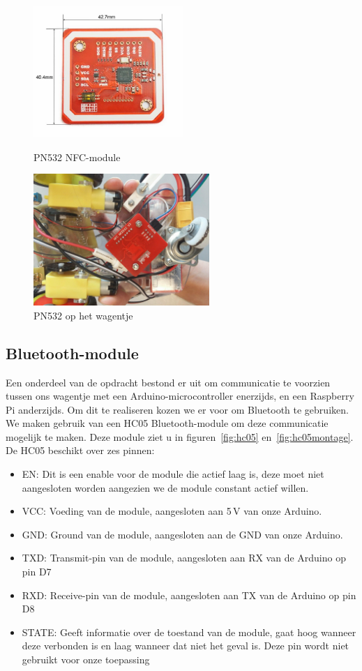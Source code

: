 \begin{figure}[H]
	\centering
	\begin{minipage}[b]{0.4\textwidth}
		\centering
		\includegraphics[height=5cm]{rfidlezer.png}
		\caption{PN532 NFC-module\label{fig:pn532}}
	\end{minipage}
	\hfill
	\begin{minipage}[b]{0.4\textwidth}
		\centering
		\includegraphics[height=5cm]{rfidlezermontage.png}
		\caption{PN532 op het wagentje\label{fig:rfidlezermontage}}
	\end{minipage}
\end{figure}
\subsection{Bluetooth-module}
Een onderdeel van de opdracht bestond er uit om communicatie te voorzien tussen ons wagentje met een Arduino-microcontroller enerzijds, en een Raspberry Pi anderzijds. Om dit te realiseren kozen we er voor om Bluetooth te gebruiken.
We maken gebruik van een HC05 Bluetooth-module om deze communicatie mogelijk te maken.
Deze module ziet u in figuren~\ref{fig:hc05} en~\ref{fig:hc05montage}. De HC05 beschikt over zes pinnen:
\begin{itemize}
	\item EN: Dit is een enable voor de module die actief laag is, deze moet niet aangesloten worden aangezien we de module constant actief willen.
	\item VCC: Voeding van de module, aangesloten aan 5\,V van onze Arduino.
	\item GND: Ground van de module, aangesloten aan de GND van onze Arduino.
	\item TXD: Transmit-pin van de module, aangesloten aan RX van de Arduino op pin D7
	\item RXD: Receive-pin van de module, aangesloten aan TX van de Arduino op pin D8
	\item STATE: Geeft informatie over de toestand van de module, gaat hoog wanneer deze verbonden is en laag wanneer dat niet het geval is. Deze pin wordt niet gebruikt voor onze toepassing
\end{itemize}

